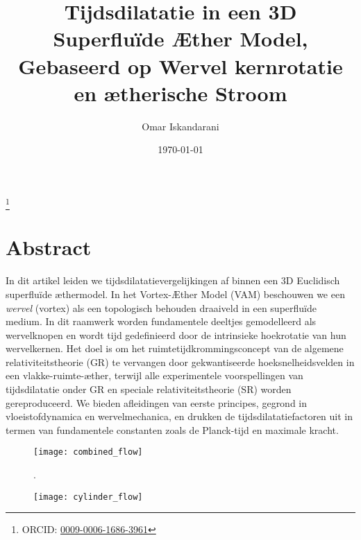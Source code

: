 \documentclass[a4paper,12pt]{revtex4}
\begin{document}
\author{Omar Iskandarani}
\title{Tijdsdilatatie in een 3D Superfluïde Æther Model, Gebaseerd op Wervel kernrotatie en ætherische Stroom}
\date{\today}
\thanks{ORCID: \href{https://orcid.org/0009-0006-1686-3961}{0009-0006-1686-3961}}

\maketitle

\section*{Abstract}
In dit artikel leiden we tijdsdilatatievergelijkingen af binnen een 3D Euclidisch superfluïde æthermodel. In het Vortex-Æther Model (VAM) beschouwen we een \textit{wervel} (vortex) als een topologisch behouden draaiveld in een superfluïde medium. In dit raamwerk worden fundamentele deeltjes gemodelleerd als wervelknopen en wordt tijd gedefinieerd door de intrinsieke hoekrotatie van hun wervelkernen. Het doel is om het ruimtetijdkrommingsconcept van de algemene relativiteitstheorie (GR) te vervangen door gekwantiseerde hoeksnelheidsvelden in een vlakke-ruimte-æther, terwijl alle experimentele voorspellingen van tijdsdilatatie onder GR en speciale relativiteitstheorie (SR) worden gereproduceerd. We bieden afleidingen van eerste principes, gegrond in vloeistofdynamica en wervelmechanica, en drukken de tijdsdilatatiefactoren uit in termen van fundamentele constanten zoals de Planck-tijd en maximale kracht.


\begin{figure}[htbp]
    \centering
    \texttt{[image: combined\_flow]}
    \caption{.}
    \label{fig:vortexfields}
\end{figure}

\begin{figure}[htbp]
    \centering
    \texttt{[image: cylinder\_flow]}
    \caption{}
    \label{fig:cylinderflow}
\end{figure}
\end{document}
